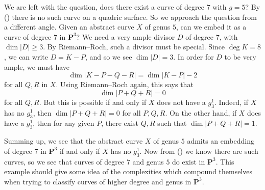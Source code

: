{We are left with the question, does there exist a curve of degree $7$ with $g=5$? By () there is no such curve on a quadric surface. So we approach the question from a different angle. Given an abstract curve $X$ of genus $5$, can we embed it as a curve of degree $7$ in $\mathbf P^3$? We need a very ample divisor $D$ of degree $7$, with $\dim|D|\ge3$. By Riemann--Roch, such a divisor must be special. Since $\deg K=8$, we can write $D=K-P$, and so we see $\dim|D|=3$. In order for $D$ to be very ample, we must have
\[
\dim|K-P-Q-R|=\dim|K-P|-2
\]
for all $Q,R$ in $X$. Using Riemann--Roch again, this says that
\[
\dim|P+Q+R|=0
\]
for all $Q,R$. But this is possible if and only if $X$ does not have a $g_3^1$. Indeed, if $X$ has no $g_3^1$, then $\dim|P+Q+R|=0$ for all $P,Q,R$. On the other hand, if $X$ does have a $g_3^1$, then for any given $P$, there exist $Q,R$ such that $\dim|P+Q+R|=1$.

Summing up, we see that the abstract curve $X$ of genus $5$ admits an embedding of degree $7$ in $\mathbf P^3$ if and only if $X$ has no $g_3^1$. Now from () we know there are such curves, so we see that curves of degree $7$ and genus $5$ do exist in $\mathbf P^3$. This example should give some idea of the complexities which compound themselves when trying to classify curves of higher degree and genus in $\mathbf P^3$.}
